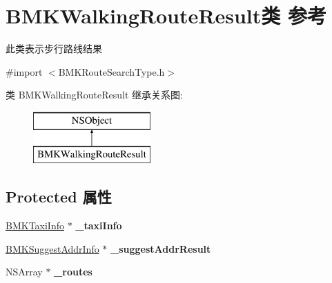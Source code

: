 \hypertarget{interface_b_m_k_walking_route_result}{\section{B\+M\+K\+Walking\+Route\+Result类 参考}
\label{interface_b_m_k_walking_route_result}
}


此类表示步行路线结果  




{\ttfamily \#import $<$B\+M\+K\+Route\+Search\+Type.\+h$>$}

类 B\+M\+K\+Walking\+Route\+Result 继承关系图\+:\begin{figure}[H]
\begin{center}
\leavevmode
\includegraphics[height=2.000000cm]{interface_b_m_k_walking_route_result}
\end{center}
\end{figure}
\subsection*{Protected 属性}
\begin{DoxyCompactItemize}
\item 
\hypertarget{interface_b_m_k_walking_route_result_a06266f058bb82711e6bb63f4d1837d95}{\hyperlink{interface_b_m_k_taxi_info}{B\+M\+K\+Taxi\+Info} $\ast$ {\bfseries \+\_\+taxi\+Info}}\label{interface_b_m_k_walking_route_result_a06266f058bb82711e6bb63f4d1837d95}

\item 
\hypertarget{interface_b_m_k_walking_route_result_ae300b05f1e799eb3d91985e88170a601}{\hyperlink{interface_b_m_k_suggest_addr_info}{B\+M\+K\+Suggest\+Addr\+Info} $\ast$ {\bfseries \+\_\+suggest\+Addr\+Result}}\label{interface_b_m_k_walking_route_result_ae300b05f1e799eb3d91985e88170a601}

\item 
\hypertarget{interface_b_m_k_walking_route_result_a9f52e1604f500f2de097f3f8d1800b45}{N\+S\+Array $\ast$ {\bfseries \+\_\+routes}}\label{interface_b_m_k_walking_route_result_a9f52e1604f500f2de097f3f8d1800b45}

\end{DoxyCompactItemize}
